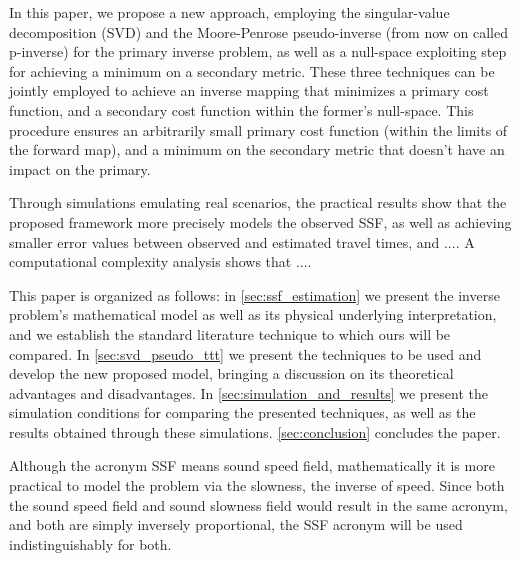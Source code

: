 In this paper, we propose a new approach, employing the singular-value decomposition (SVD) and the Moore-Penrose pseudo-inverse (from now on called p-inverse) for the primary inverse problem, as well as a null-space exploiting step for achieving a minimum on a secondary metric. These three techniques can be jointly employed to achieve an inverse mapping that minimizes a primary cost function, and a secondary cost function within the former's null-space. This procedure ensures an arbitrarily small primary cost function (within the limits of the forward map), and a minimum on the secondary metric that doesn't have an impact on the primary.

Through simulations emulating real scenarios, the practical results show that the proposed framework more precisely models the observed SSF, as well as achieving smaller error values between observed and estimated travel times, and .... A computational complexity analysis shows that ....

This paper is organized as follows: in \cref{sec:ssf_estimation} we present the inverse problem's mathematical model as well as its physical underlying interpretation, and we establish the standard literature technique to which ours will be compared. In \cref{sec:svd_pseudo_ttt} we present the techniques to be used and develop the new proposed model, bringing a discussion on its theoretical advantages and disadvantages. In \cref{sec:simulation_and_results} we present the simulation conditions for comparing the presented techniques, as well as the results obtained through these simulations. \cref{sec:conclusion} concludes the paper.

Although the acronym SSF means sound speed field, mathematically it is more practical to model the problem via the slowness, the inverse of speed. Since both the sound speed field and sound slowness field would result in the same acronym, and both are simply inversely proportional, the SSF acronym will be used indistinguishably for both.
